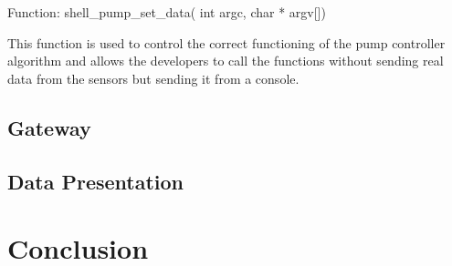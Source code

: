 \documentclass[11pt,paper=a4,parskip=half]{scrartcl}
\begin{document}
Function: shell\_pump\_set\_data( int argc, char * argv[])

This function is used to control the correct functioning of the pump controller algorithm and allows the developers to call the functions without sending real data from the sensors but sending it from a console.
\subsection{Gateway}



\subsection{Data Presentation}



\section{Conclusion}





\newpage
\nocite{*}


\end{document}
